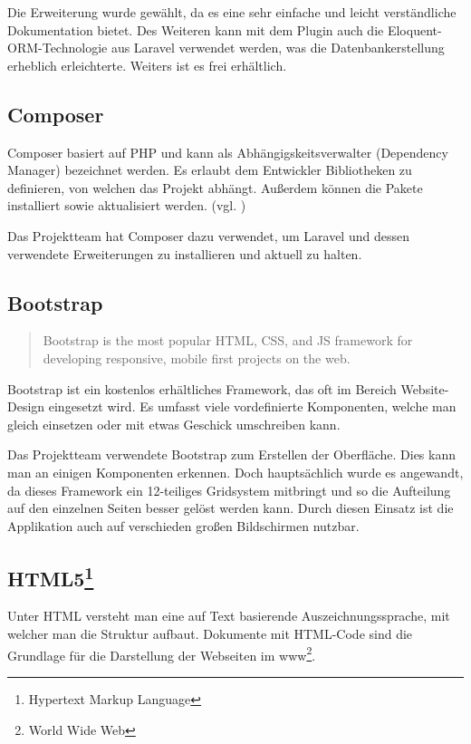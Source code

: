 Die Erweiterung wurde gewählt, da es eine sehr einfache und leicht verständliche Dokumentation bietet. Des Weiteren kann mit dem Plugin auch die Eloquent-ORM-Technologie aus Laravel verwendet werden, was die Datenbankerstellung erheblich erleichterte. Weiters ist es frei erhältlich.

\subsection{Composer}\label{technologien:composer}
Composer basiert auf PHP und kann als Abhängigskeitsverwalter (Dependency  Manager) bezeichnet werden. Es erlaubt dem Entwickler Bibliotheken zu definieren, von welchen das Projekt abhängt. Außerdem können die Pakete installiert sowie aktualisiert werden. (vgl. \cite{html5})

Das Projektteam hat Composer dazu verwendet, um Laravel und dessen verwendete Erweiterungen zu installieren und aktuell zu halten.

\subsection{Bootstrap}
\begin{quote}
\glqq Bootstrap is the most popular HTML, CSS, and JS framework for developing responsive, mobile first projects on the web.\grqq{} \cite{bootstrap}
\end{quote}
Bootstrap ist ein kostenlos erhältliches Framework, das oft im Bereich Website-Design eingesetzt wird. Es umfasst viele vordefinierte Komponenten, welche man gleich einsetzen oder mit etwas Geschick umschreiben kann.

Das Projektteam verwendete Bootstrap zum Erstellen der Oberfläche. Dies kann man an einigen Komponenten erkennen. Doch hauptsächlich wurde es angewandt, da dieses Framework ein 12-teiliges Gridsystem mitbringt und so die Aufteilung auf den einzelnen Seiten besser gelöst werden kann. Durch diesen Einsatz ist die Applikation auch auf verschieden großen Bildschirmen nutzbar.

\subsection[HTML5]{HTML5\footnote{Hypertext Markup Language}}
\label{technologien:html5}
Unter HTML versteht man eine auf Text basierende Auszeichnungssprache, mit welcher man die Struktur aufbaut. Dokumente mit HTML-Code sind die Grundlage für die Darstellung der Webseiten im www\footnote{World Wide Web}.

